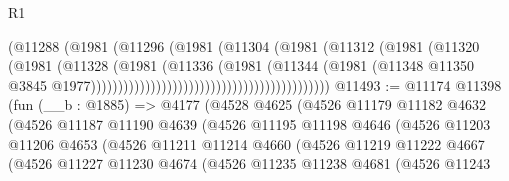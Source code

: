 \begin{lexlean}{R1}
\begin{coremodule}
                                                          (@11288
                                                            (@1981
                                                              (@11296
                                                                (@1981
                                                                  (@11304
                                                                    (@1981
                                                                      (@11312
                                                                        (@1981
                                                                          (@11320
                                                                            (@1981
                                                                              (@11328
                                                                                (@1981
                                                                                  (@11336
                                                                                    (@1981
                                                                                      (@11344
                                                                                        (@1981
                                                                                          (@11348
                                                                                            @11350
                                                                                            @3845
                                                                                            @1977))))))))))))))))))))))))))))))))))))))))))))
@11493 := @11174
    @11398
    (fun (__b : @1885) =>
    @4177
      (@4528
        @4625
        (@4526
          @11179
          @11182
          @4632
          (@4526
            @11187
            @11190
            @4639
            (@4526
              @11195
              @11198
              @4646
              (@4526
                @11203
                @11206
                @4653
                (@4526
                  @11211
                  @11214
                  @4660
                  (@4526
                    @11219
                    @11222
                    @4667
                    (@4526
                      @11227
                      @11230
                      @4674
                      (@4526
                        @11235
                        @11238
                        @4681
                        (@4526
                          @11243

\end{coremodule}
\end{lexlean}
